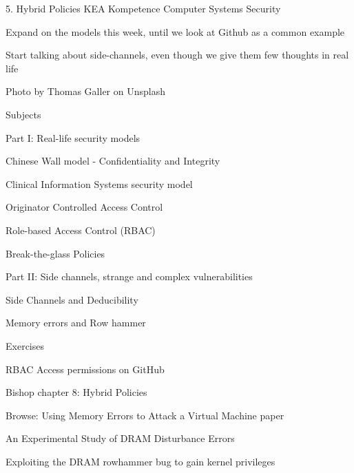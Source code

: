 \documentclass[Screen16to9,17pt]{foils}
\begin{document}
\mytitlepage
{5. Hybrid Policies}
{KEA Kompetence Computer Systems Security \the\year}



 
\begin{list2}
\item Expand on the models this week, until we look at Github as a common example
\item Start talking about side-channels, even though we give them few thoughts in real life
\end{list2}

{\small Photo by Thomas Galler on Unsplash}



\begin{list1}
\item Subjects
\item Part I: Real-life security models
\begin{list2}
\item Chinese Wall model - Confidentiality and Integrity
\item Clinical Information Systems security model
\item Originator Controlled Access Control
\item Role-based Access Control (RBAC)
\item Break-the-glass Policies
\end{list2}
\item Part II: Side channels, strange and complex vulnerabilities
\begin{list2}
\item Side Channels and Deducibility
\item Memory errors and Row hammer
\end{list2}
\item Exercises
\begin{list2}
\item RBAC Access permissions on GitHub
\end{list2}
\end{list1}




\begin{list1}
\item Bishop chapter 8: Hybrid Policies
\item Browse: Using Memory Errors to Attack a Virtual Machine paper
\item An Experimental Study of DRAM Disturbance Errors
\item Exploiting the DRAM rowhammer bug to gain kernel privileges
\item {}
\end{list1}
\end{document}

